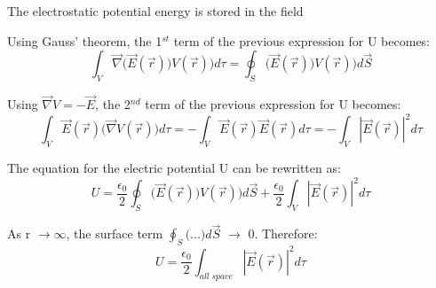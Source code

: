 %
%
%

\begin{frame}{The electrostatic potential energy is stored in the field}

Using Gauss' theorem, the 1$^{st}$ term of the previous expression for U becomes:
\begin{equation*}
   \int_{V} \vec{\nabla} \Big(\vec{E}(\vec{r})) V(\vec{r}) \Big) d\tau =
   \oint_{S} \Big(\vec{E}(\vec{r})) V(\vec{r}) \Big) d\vec{S}
\end{equation*}

Using $\vec{\nabla} V = - \vec{E}$, the 2$^{nd}$ term of the previous expression for U becomes:
\begin{equation*}
   \int_{V} \vec{E}(\vec{r}) \Big(\vec{\nabla} V(\vec{r}) \Big) d\tau =
  -\int_{V} \vec{E}(\vec{r}) \vec{E}(\vec{r}) d\tau =
  -\int_{V} |\vec{E}(\vec{r})|^{2} d\tau
\end{equation*}

The equation for the electric potential U can be rewritten as:
\begin{equation*}
   U = \frac{\epsilon_0}{2} \oint_{S} \Big(\vec{E}(\vec{r})) V(\vec{r}) \Big) d\vec{S} +
       \frac{\epsilon_0}{2} \int_{V} |\vec{E}(\vec{r})|^2  d\tau
\end{equation*}

As r $\rightarrow\infty$, the surface term $\oint_{S} \Big(...\Big) d\vec{S}$ $\rightarrow$ 0.
Therefore:
\begin{equation*}
   U = \frac{\epsilon_0}{2} \int_{all\;space} |\vec{E}(\vec{r})|^2  d\tau
\end{equation*}

\end{frame}


%
%
%

